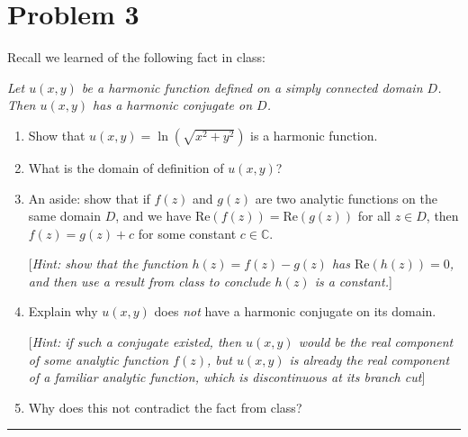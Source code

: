 \documentclass{article}
\begin{document}
\section*{Problem 3}
Recall we learned of the following fact in class:

\begin{center}
	{\em Let $u(x,y)$ be a harmonic function defined on a simply connected domain $D$. \\ Then $u(x,y)$ has a harmonic conjugate on $D$.}
\end{center}

\begin{enumerate}
	\item [(a)] Show that $u(x,y) = \ln(\sqrt{x^2 + y^2})$ is a harmonic function.

	\item [(b)] What is the domain of definition of $u(x,y)$?

	\item [(c)] An aside: show that if $f(z)$ and $g(z)$ are two analytic functions on the same domain $D$, and we have $\text{Re}(f(z)) = \text{Re}(g(z))$ for all $z \in D$, then $f(z) = g(z) + c$ for some constant $c \in \mathbb{C}$.

          [{\em Hint: show that the function $h(z) = f(z) - g(z)$ has $\text{Re}(h(z)) = 0$, and then use a result from class to conclude $h(z)$ is a constant.}]

	\item [(d)] Explain why $u(x,y)$ does {\it not} have a harmonic conjugate on its domain.

          [{\em Hint: if such a conjugate existed, then $u(x,y)$ would be the real component of some analytic function $f(z)$, but $u(x,y)$ is already the real component of a familiar analytic function, which is discontinuous at its branch cut}]

	\item Why does this not contradict the fact from class?
\end{enumerate}

\vspace{.5cm} %

\hrule
\end{document}
